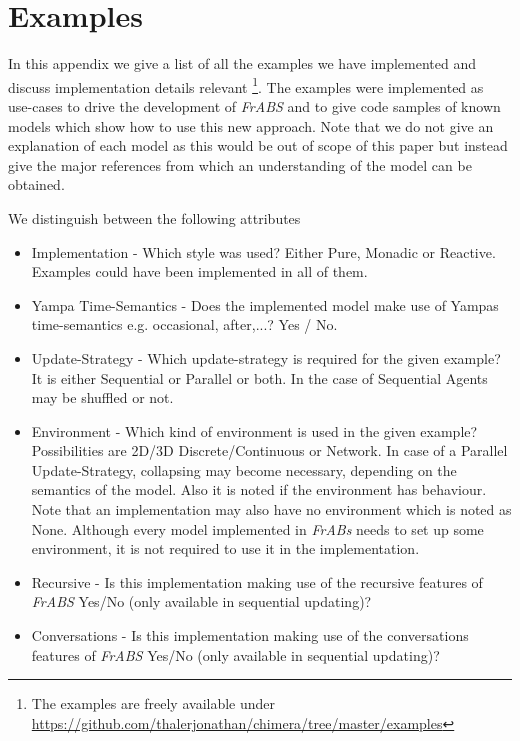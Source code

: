 \section{Examples}
\label{app:examples}
In this appendix we give a list of all the examples we have implemented and discuss implementation details relevant \footnote{The examples are freely available under \url{https://github.com/thalerjonathan/chimera/tree/master/examples}}. The examples were implemented as use-cases to drive the development of \textit{FrABS} and to give code samples of known models which show how to use this new approach. Note that we do not give an explanation of each model as this would be out of scope of this paper but instead give the major references from which an understanding of the model can be obtained.

We distinguish between the following attributes
\begin{itemize}
	\item Implementation - Which style was used? Either Pure, Monadic or Reactive. Examples could have been implemented in all of them.
	\item Yampa Time-Semantics - Does the implemented model make use of Yampas time-semantics e.g. occasional, after,...? Yes / No.
	\item Update-Strategy - Which update-strategy is required for the given example? It is either Sequential or Parallel or both. In the case of Sequential Agents may be shuffled or not.
	\item Environment - Which kind of environment is used in the given example? Possibilities are 2D/3D Discrete/Continuous or Network. In case of a Parallel Update-Strategy, collapsing may become necessary, depending on the semantics of the model. Also it is noted if the environment has behaviour. Note that an implementation may also have no environment which is noted as None. Although every model implemented in \textit{FrABs} needs to set up some environment, it is not required to use it in the implementation.
	\item Recursive - Is this implementation making use of the recursive features of \textit{FrABS} Yes/No (only available in sequential updating)?
	\item Conversations - Is this implementation making use of the conversations features of \textit{FrABS} Yes/No (only available in sequential updating)?
\end{itemize}


